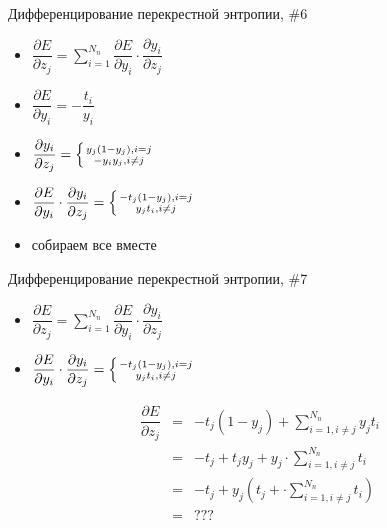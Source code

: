 \documentclass[10pt]{beamer}
\begin{document}
\begin{frame}{Дифференцирование перекрестной энтропии, \#6}

\begin{itemize}
	\item $\dfrac{\partial E}{\partial z_j} = \sum_{i = 1}^{N_{n}} \dfrac{\partial E}{\partial y_i} \cdot \dfrac{\partial y_i}{\partial z_j}$
	\item $\dfrac{\partial E}{\partial y_i} = -\dfrac{t_i}{y_i}$
	\item $\dfrac{\partial y_i}{\partial z_j} = \left\{ { y_j\left( 1 - y_j \right), i = j \atop -y_i y_j, i \neq j} \right.$
	\item $\dfrac{\partial E}{\partial y_i} \cdot \dfrac{\partial y_i}{\partial z_j} = \left\{ { -t_j\left(1 - y_j\right), i = j \atop y_j t_i, i \neq j } \right.$
	\item собираем все вместе
\end{itemize}

\end{frame}


\begin{frame}{Дифференцирование перекрестной энтропии, \#7}

\begin{itemize}
	\item $\dfrac{\partial E}{\partial z_j} = \sum_{i = 1}^{N_{n}} \dfrac{\partial E}{\partial y_i} \cdot \dfrac{\partial y_i}{\partial z_j}$
	\item $\dfrac{\partial E}{\partial y_i} \cdot \dfrac{\partial y_i}{\partial z_j} = \left\{ { -t_j\left(1 - y_j\right), i = j \atop y_j t_i, i \neq j } \right.$
\end{itemize}

\begin{eqnarray*}
\dfrac{\partial E}{\partial z_j} &=& -t_j\left(1 - y_j\right) + \sum_{i = 1, i \neq j}^{N_{n}} y_j t_i \\
&=& -t_j + t_j y_j + y_j \cdot \sum_{i = 1, i \neq j}^{N_{n}} t_i \\
&=& -t_j + y_j \left(t_j + \cdot \sum_{i = 1, i \neq j}^{N_{n}} t_i \right) \\
&=& ???
\end{eqnarray*}

\end{frame}
\end{document}
